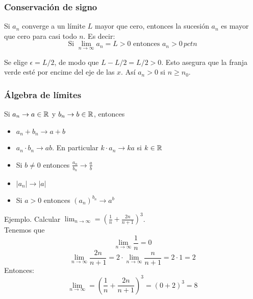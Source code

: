 \documentclass[../Teoría.root.tex]{subfiles}
\begin{document}
    \subsubsection{Conservación de signo}
    Si \(a_n\) converge a un límite \(L\) mayor que cero, entonces la sucesión \(a_n\) es mayor que cero para casi todo \(n\). Es decir: \[\text{Si }\lim_{n\to\infty}a_n=L>0\text{ entonces }a_n>0\,pctn\]
    \begin{center}
        \begin{scaletikzpicturetowidth}{.5\linewidth}
        \end{scaletikzpicturetowidth}
    \end{center}
    Se elige \(\epsilon=L/2\), de modo que \(L-L/2=L/2>0\). Esto asegura que la franja verde esté por encime del eje de las \(x\). Así \(a_n>0\) si \(n\geq n_0\).
    \subsubsection{Álgebra de límites}
    Si \(a_n\rightarrow a\in\mathbb{R}\) y \(b_n\rightarrow b\in\mathbb{R}\), entonces
    \begin{itemize}
        \item \(a_n+b_n\rightarrow a+b\)
        \item \(a_n\cdot b_n\rightarrow ab\). En particular \(k\cdot a_n\rightarrow ka\) si \(k\in\mathbb{R}\)
        \item Si \(b\neq0\) entonces \(\frac{a_n}{b_n}\rightarrow\frac{a}{b}\)
        \item \(|a_n|\rightarrow|a|\)
        \item Si \(a>0\) entonces \((a_n)^{b_n}\rightarrow a^b\)
    \end{itemize}
    Ejemplo. Calcular \(\lim_{n\to\infty}=\left(\frac{1}{n}+\frac{2n}{n+1}\right)^3\).\\
    Tenemos que \[\lim_{n\to\infty}\frac{1}{n}=0\] \[\lim_{n\to\infty}\frac{2n}{n+1}=2\cdot\lim_{n\to\infty}\frac{n}{n+1}=2\cdot1=2\]
    Entonces: \[\lim_{n\to\infty}=\left(\frac{1}{n}+\frac{2n}{n+1}\right)^3=(0+2)^3=8\]
\end{document}
